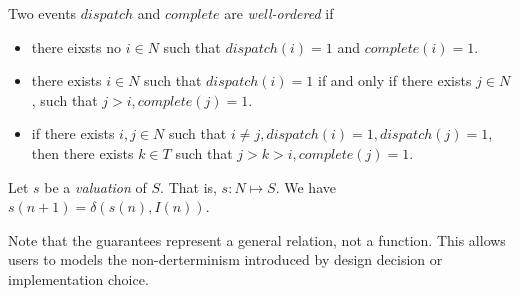Two events $dispatch$ and $complete$ are \emph{well-ordered} if 
\begin{itemize}
	\item there eixsts no $i\in N$ such that $dispatch(i) = 1$ and $complete(i) =  1$.
	\item there exists $i\in N$ such that $dispatch(i) = 1$ if and only if there exists $j\in N$, such that $j > i, complete(j) =  1$.
	\item if there exists $i, j\in N$ such that $i \neq j, dispatch(i) = 1, dispatch(j) = 1$, then there exists $k\in T$ such that $j >k> i, complete(j) = 1$.
\end{itemize}

Let $s$ be a \emph{valuation} of $S$. That is, $s: N \mapsto S$. We have $ s(n+1) = \delta (s(n), I(n))$.

Note that the guarantees represent a general relation, not a function. This allows users to models the non-derterminism introduced by design decision or implementation choice.
  




